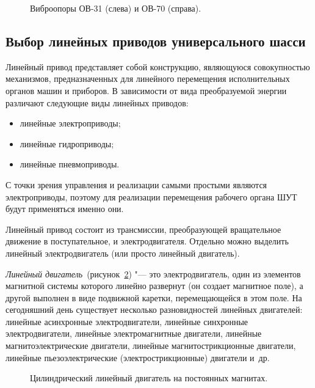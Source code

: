 \begin{figure}[ht]
	\caption{Виброопоры ОВ-31 (слева) и ОВ-70 (справа).}\label{fig:vibro}
\end{figure}

\subsection{Выбор линейных приводов универсального шасси}

Линейный привод представляет собой конструкцию, являющуюся совокупностью механизмов, предназначенных для линейного перемещения исполнительных органов машин и приборов. В зависимости от вида преобразуемой энергии различают следующие виды линейных приводов:

\begin{itemize}
	\item линейные электроприводы;
	
	\item линейные гидроприводы;
	
	\item линейные пневмоприводы.
\end{itemize}

С точки зрения управления и реализации самыми простыми являются электроприводы, поэтому для реализации перемещения рабочего органа ШУТ будут применяться именно они.

Линейный привод состоит из трансмиссии, преобразующей вращательное движение в поступательное, и электродвигателя. Отдельно можно выделить линейный электродвигатель (или просто линейный двигатель).

\textit{Линейный двигатель}~(рисунок~\cref{fig:lindrive}) "--- это электродвигатель, один из элементов магнитной системы которого линейно развернут (он создает магнитное поле), а другой выполнен в виде подвижной каретки, перемещающейся в этом поле. На сегодняшний день существует несколько разновидностей линейных двигателей: линейные асинхронные электродвигатели, линейные синхронные электродвигатели, линейные электромагнитные двигатели, линейные магнитоэлектрические двигатели, линейные магнитострикционные двигатели, линейные пьезоэлектрические (электрострикционные) двигатели и~др.

\begin{figure}[ht]
	\caption{Цилиндрический линейный двигатель на постоянных магнитах.}\label{fig:lindrive}
\end{figure}

